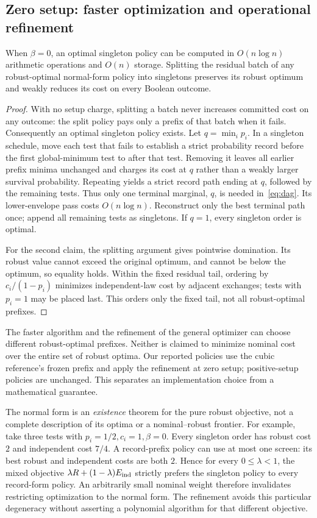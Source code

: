 \documentclass[runningheads]{llncs}
\begin{document}
\subsection{Zero setup: faster optimization and operational refinement}
\begin{theorem}\label{thm:zero}
When $\beta=0$, an optimal singleton policy can be computed in
$O(n\log n)$ arithmetic operations and $O(n)$ storage. Splitting the residual
batch of any robust-optimal normal-form policy into singletons preserves its
robust optimum and weakly reduces its cost on every Boolean outcome.
\end{theorem}
\begin{proof}
With no setup charge, splitting a batch never increases committed cost on
any outcome: the split policy pays only a prefix of that batch when it fails.
Consequently an optimal singleton policy exists. Let $q=\min_i p_i$.
In a singleton schedule, move each test that fails to establish a strict
probability record before the first global-minimum test to after that test.
Removing it leaves all earlier prefix minima unchanged and charges its cost
at $q$ rather than a weakly larger survival probability. Repeating yields a
strict record path ending at $q$, followed by the remaining tests. Thus only
one terminal marginal, $q$, is needed in~\eqref{eq:dag}. Its lower-envelope
pass costs $O(n\log n)$. Reconstruct only the best terminal path once; append
all remaining tests as singletons. If $q=1$, every singleton order is optimal.

For the second claim, the splitting argument gives pointwise domination.
Its robust value cannot exceed the original optimum, and cannot be below
the optimum, so equality holds. Within the fixed residual tail, ordering by
$c_i/(1-p_i)$ minimizes independent-law cost by adjacent exchanges; tests
with $p_i=1$ may be placed last. This orders only the fixed tail, not all
robust-optimal prefixes.
\end{proof}
The faster algorithm and the refinement of the general optimizer can choose
different robust-optimal prefixes. Neither is claimed to minimize nominal
cost over the entire set of robust optima. Our reported policies use the
cubic reference's frozen prefix and apply the refinement at zero setup;
positive-setup policies are unchanged. This separates an implementation
choice from a mathematical guarantee.

The normal form is an \emph{existence} theorem for the pure robust objective,
not a complete description of its optima or a nominal--robust frontier.
For example, take three tests with $p_i=1/2,c_i=1,\beta=0$.
Every singleton order has robust cost $2$ and independent cost $7/4$.
A record-prefix policy can use at most one screen: its best robust and
independent costs are both $2$. Hence for every $0\leq\lambda<1$, the mixed
objective $\lambda R+(1-\lambda)E_{\rm ind}$ strictly prefers the singleton
policy to every record-form policy. An arbitrarily small nominal weight
therefore invalidates restricting optimization to the normal form.
The refinement avoids this particular degeneracy without asserting a
polynomial algorithm for that different objective.
\end{document}
